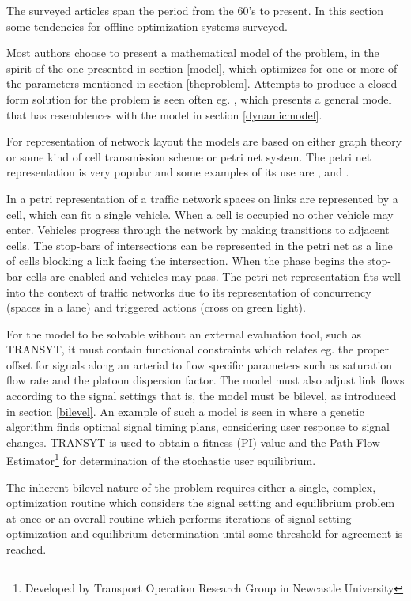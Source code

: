 \label{offline}
The surveyed articles span the period from the 60's to present. In this section some tendencies for offline optimization systems surveyed.

Most authors choose to present a mathematical model of the problem, in the spirit of the one presented in section \ref{model}, which optimizes for one or more of the parameters mentioned in section \ref{theproblem}. Attempts to produce a closed form solution for the problem is seen often eg. \cite{36}, which presents a general model that has resemblences with the model in section \ref{dynamicmodel}.

For representation of network layout the models are based on either graph theory or some kind of cell transmission scheme or petri net system. The petri net representation is very popular and some examples of its use are \cite{12}, \cite{16} and \cite{petri}.

In a petri representation of a traffic network spaces on links are represented by a cell, which can fit a single vehicle. When a cell is occupied no other vehicle may enter. Vehicles progress through the network by making transitions to adjacent cells. The stop-bars of intersections can be represented in the petri net as a line of cells blocking a link facing the intersection. When the phase begins the stop-bar cells are enabled and vehicles may pass.
The petri net representation fits well into the context of traffic networks due to its representation of concurrency (spaces in a lane) and triggered actions (cross on green light).

For the model to be solvable without an external evaluation tool, such as TRANSYT, it must contain functional constraints which relates eg. the proper offset for signals along an arterial to flow specific parameters such as saturation flow rate and the platoon dispersion factor.
The model must also adjust link flows according to the signal settings that is, the model must be bilevel, as introduced in section \ref{bilevel}. An example of such a model is seen in \cite{33} where a genetic algorithm finds optimal signal timing plans, considering user response to signal changes. TRANSYT is used to obtain a fitness (PI) value and the Path Flow Estimator\footnote{Developed by Transport Operation Research Group in Newcastle University} for determination of the stochastic user equilibrium.

The inherent bilevel nature of the problem requires either a single, complex, optimization routine which considers the signal setting and equilibrium problem at once or an overall routine which performs iterations of signal setting optimization and equilibrium determination until some threshold for agreement is reached. 

